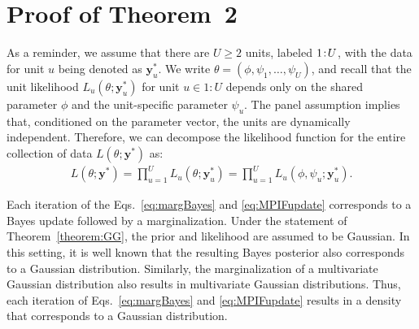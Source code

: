 \section{Proof of Theorem~2}\label{appendix:Gaus}

As a reminder, we assume that there are $U\geq 2$ units, labeled ${1}\!:\!{U}$, with the data for unit $u$ being denoted as $\mathbf{y}^*_u$. 
We write $\theta = (\phi, \psi_1, \ldots, \psi_U)$, and recall that the unit likelihood $L_{u}(\theta;\mathbf{y}^*_u)$ for unit $u \in 1:U$ depends only on the shared parameter $\phi$ and the unit-specific parameter $\psi_u$.
The panel assumption implies that, conditioned on the parameter vector, the units are dynamically independent.
Therefore, we can decompose the likelihood function for the entire collection of data $L(\theta; \mathbf{y}^*)$ as:
\begin{align*}
    L(\theta; \mathbf{y}^*) = \prod_{u = 1}^U L_u(\theta;\mathbf{y}_u^*) = \prod_{u = 1}^U L_u(\phi, \psi_u;\mathbf{y}_u^*).
\end{align*}

Each iteration of the Eqs.~\ref{eq:margBayes} and \ref{eq:MPIFupdate} corresponds to a Bayes update followed by a marginalization. 
Under the statement of Theorem~\ref{theorem:GG}, the prior and likelihood are assumed to be Gaussian.
In this setting, it is well known that the resulting Bayes posterior also corresponds to a Gaussian distribution. 
Similarly, the marginalization of a multivariate Gaussian distribution also results in multivariate Gaussian distributions. 
Thus, each iteration of Eqs.~\ref{eq:margBayes} and \ref{eq:MPIFupdate} results in a density that corresponds to a Gaussian distribution. 

